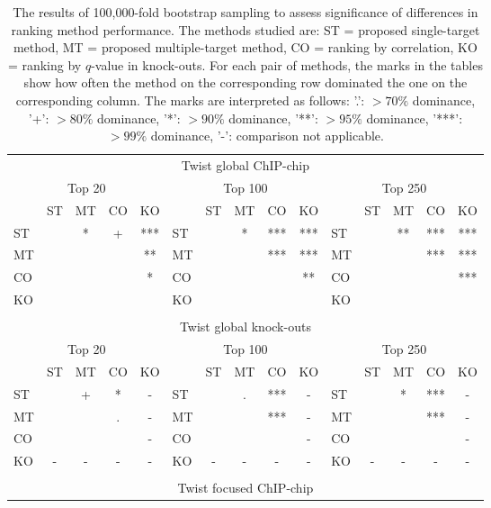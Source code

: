 \documentclass{article}
\begin{document}
\begin{longtable}[c]{lcccc|lcccc|lcccc}
  \caption{The results of 100,000-fold bootstrap sampling to assess
significance of differences in ranking method performance.  The methods
studied are: ST = proposed single-target method, MT = proposed
multiple-target method, CO = ranking by correlation, KO = ranking by
$q$-value in knock-outs.  For each pair of methods, the marks in the
tables show how often the method on the corresponding row dominated
the one on the corresponding column.  The marks are interpreted as
follows: '.': $> 70 \%$ dominance, '+': $> 80 \%$ dominance,
'*': $> 90 \%$ dominance, '**': $> 95 \%$ dominance, '***': $> 99 \%$
dominance, '-': comparison not applicable.} \\
\multicolumn{15}{c}{Twist global ChIP-chip} \\
\multicolumn{5}{c|}{Top 20} &\multicolumn{5}{c|}{Top 100}  & \multicolumn{5}{c}{Top 250}\\
    & ST  & MT  & CO  & KO &     & ST  & MT  & CO  & KO  &     & ST  & MT  & CO  & KO \\
ST &     & *   & +   & *** & ST &     & *   & *** & *** & ST &     & **  & *** & ***\\
MT &     &     &     & **  & MT &     &     & *** & *** & MT &     &     & *** & ***\\
CO &     &     &     & *   & CO &     &     &     & **  & CO &     &     &     & ***\\
KO &     &     &     &     & KO &     &     &     &     & KO &     &     &     &    \\
\hline
\\[0mm]
\multicolumn{15}{c}{Twist global knock-outs} \\
\multicolumn{5}{c|}{Top 20} &\multicolumn{5}{c|}{Top 100}  & \multicolumn{5}{c}{Top 250}\\
    & ST  & MT  & CO  & KO &     & ST  & MT  & CO  & KO  &     & ST  & MT  & CO  & KO \\
ST &     & +   & *   & -   & ST &     & .   & *** & -   & ST &     & *   & *** & -  \\
MT &     &     & .   & -   & MT &     &     & *** & -   & MT &     &     & *** & -  \\
CO &     &     &     & -   & CO &     &     &     & -   & CO &     &     &     & -  \\
KO & -   & -   & -   & -   & KO & -   & -   & -   & -   & KO & -   & -   & -   & -  \\
\hline
\\[0mm]
\multicolumn{15}{c}{Twist focused ChIP-chip} \\

\end{longtable}
\end{document}
